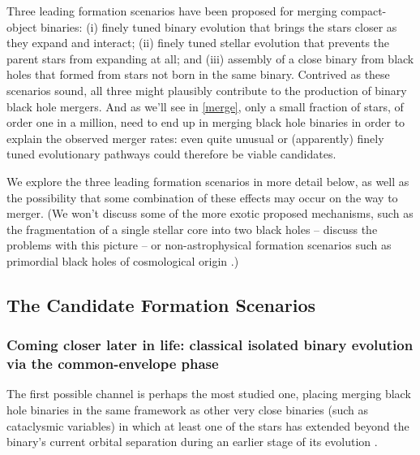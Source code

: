 \documentclass[iop,onecolumn]{revtex4}
\begin{document}
Three leading formation scenarios have been proposed for merging compact-object binaries: (i) finely tuned binary evolution that brings the stars closer as they expand and interact; (ii) finely tuned stellar evolution that prevents the parent stars from expanding at all; and (iii) assembly of a close binary from black holes that formed from stars not born in the same binary. Contrived as these scenarios sound, all three might plausibly contribute to the production of binary black hole mergers.  And as we'll see in \autoref{merge}, only a small fraction of stars, of order one in a million, need to end up in merging black hole binaries in order to explain the observed merger rates: even quite unusual or (apparently) finely tuned evolutionary pathways could therefore be viable candidates.

We explore the three leading formation scenarios in more detail below, as well as the possibility that some combination of these effects may occur on the way to merger. (We won't discuss some of the more exotic proposed mechanisms, such as the fragmentation of a single stellar core into two black holes \citep{Loeb:2016} -- \citet{Woosley:2016,Dai:2017} discuss the problems with this picture -- or non-astrophysical formation scenarios such as primordial black holes of cosmological origin \citep[e.g.,][]{Bird:2016}.)

\subsection{The Candidate Formation Scenarios}
\subsubsection{Coming closer later in life: classical isolated binary evolution via the common-envelope phase}
\label{form:isol}

The first possible channel is perhaps the most studied one, placing merging black hole binaries in the same framework as other very close binaries (such as cataclysmic variables) in which at least one of the stars has extended beyond the binary's current orbital separation during an earlier stage of its evolution \citep[e.g.,][]{Paczynski:1976}. 
\end{document}
